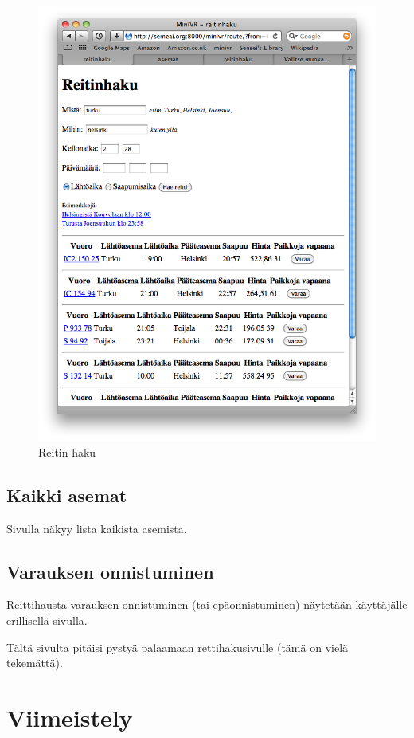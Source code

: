 \documentclass[a4paper,twoside,titlepage,12pt]{article}
\begin{document}
\begin{figure}
  \includegraphics[width=130mm]{route.png}
  \caption{Reitin haku}
\end{figure}

\subsection{Kaikki asemat}
Sivulla näkyy lista kaikista asemista.

\subsection{Varauksen onnistuminen}

Reittihausta varauksen onnistuminen (tai epäonnistuminen) näytetään
käyttäjälle erillisellä sivulla.

Tältä sivulta pitäisi pystyä palaamaan rettihakusivulle (tämä on vielä
tekemättä).

\section{Viimeistely}
\end{document}
